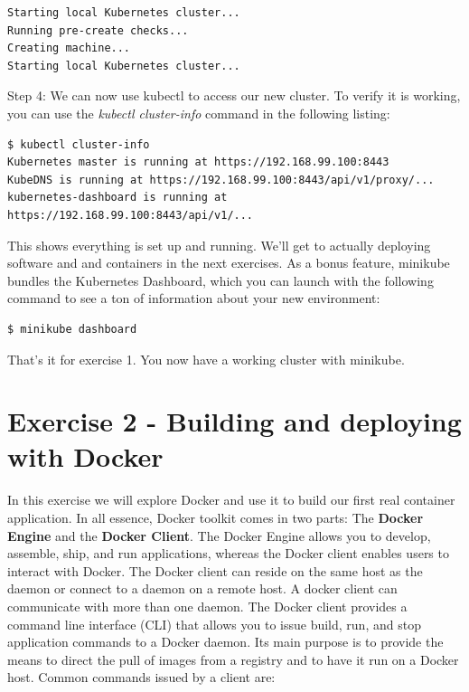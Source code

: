 \documentclass[a4paper,10pt]{article}
\begin{document}
\begin{lstlisting}[numbers=none, basicstyle=\ttfamily]
Starting local Kubernetes cluster...
Running pre-create checks...
Creating machine...
Starting local Kubernetes cluster...
\end{lstlisting}

Step 4: We can now use kubectl to access our new cluster. To verify it is working, you can use the \textit{kubectl cluster-info} command in the following listing:

\begin{lstlisting}[numbers=none, basicstyle=\ttfamily]
$ kubectl cluster-info
Kubernetes master is running at https://192.168.99.100:8443
KubeDNS is running at https://192.168.99.100:8443/api/v1/proxy/...
kubernetes-dashboard is running at https://192.168.99.100:8443/api/v1/...
\end{lstlisting}

This shows everything is set up and running. We'll get to actually deploying software and and containers in the next exercises. As a bonus feature, minikube bundles the Kubernetes Dashboard, which you can launch with the following command to see a ton of information about your new environment:

\begin{lstlisting}[numbers=none, basicstyle=\ttfamily]
$ minikube dashboard
\end{lstlisting}

That's it for exercise 1. You now have a working cluster with minikube.

\pagebreak

\section{Exercise 2 - Building and deploying with Docker}

In this exercise we will explore Docker and use it to build our first real container application. In all essence, Docker toolkit comes in two parts: The \textbf{Docker Engine} and the \textbf{Docker Client}. The Docker Engine allows you to develop, assemble, ship, and run applications, whereas the Docker client enables users to interact with Docker. The Docker client can reside on the same host as the daemon or connect to a daemon on a remote host. A docker client can communicate with more than one daemon. The Docker client provides a command line interface (CLI) that allows you to issue build, run, and stop application commands to a Docker daemon. Its main purpose is to provide the means to direct the pull of images from a registry and to have it run on a Docker host. Common commands issued by a client are: \\
\end{document}
